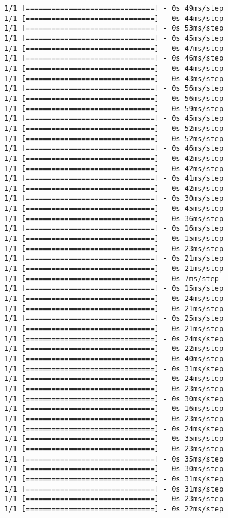 \documentclass[11pt]{article}
\begin{document}
\begin{Verbatim}[commandchars=\\\{\}]
1/1 [==============================] - 0s 49ms/step
1/1 [==============================] - 0s 44ms/step
1/1 [==============================] - 0s 53ms/step
1/1 [==============================] - 0s 45ms/step
1/1 [==============================] - 0s 47ms/step
1/1 [==============================] - 0s 46ms/step
1/1 [==============================] - 0s 44ms/step
1/1 [==============================] - 0s 43ms/step
1/1 [==============================] - 0s 56ms/step
1/1 [==============================] - 0s 56ms/step
1/1 [==============================] - 0s 59ms/step
1/1 [==============================] - 0s 45ms/step
1/1 [==============================] - 0s 52ms/step
1/1 [==============================] - 0s 52ms/step
1/1 [==============================] - 0s 46ms/step
1/1 [==============================] - 0s 42ms/step
1/1 [==============================] - 0s 42ms/step
1/1 [==============================] - 0s 41ms/step
1/1 [==============================] - 0s 42ms/step
1/1 [==============================] - 0s 30ms/step
1/1 [==============================] - 0s 45ms/step
1/1 [==============================] - 0s 36ms/step
1/1 [==============================] - 0s 16ms/step
1/1 [==============================] - 0s 15ms/step
1/1 [==============================] - 0s 23ms/step
1/1 [==============================] - 0s 21ms/step
1/1 [==============================] - 0s 21ms/step
1/1 [==============================] - 0s 7ms/step
1/1 [==============================] - 0s 15ms/step
1/1 [==============================] - 0s 24ms/step
1/1 [==============================] - 0s 21ms/step
1/1 [==============================] - 0s 25ms/step
1/1 [==============================] - 0s 21ms/step
1/1 [==============================] - 0s 24ms/step
1/1 [==============================] - 0s 22ms/step
1/1 [==============================] - 0s 40ms/step
1/1 [==============================] - 0s 31ms/step
1/1 [==============================] - 0s 24ms/step
1/1 [==============================] - 0s 23ms/step
1/1 [==============================] - 0s 30ms/step
1/1 [==============================] - 0s 16ms/step
1/1 [==============================] - 0s 23ms/step
1/1 [==============================] - 0s 24ms/step
1/1 [==============================] - 0s 35ms/step
1/1 [==============================] - 0s 23ms/step
1/1 [==============================] - 0s 35ms/step
1/1 [==============================] - 0s 30ms/step
1/1 [==============================] - 0s 31ms/step
1/1 [==============================] - 0s 31ms/step
1/1 [==============================] - 0s 23ms/step
1/1 [==============================] - 0s 22ms/step

\end{Verbatim}
\end{document}
